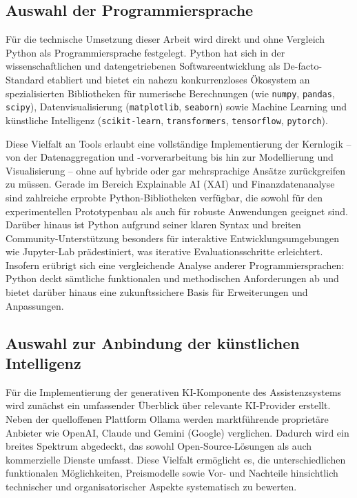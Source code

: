   \subsection{Auswahl der Programmiersprache}

    Für die technische Umsetzung dieser Arbeit wird direkt und ohne Vergleich Python als Programmiersprache festgelegt.
    Python hat sich in der wissenschaftlichen und datengetriebenen Softwareentwicklung als De-facto-Standard etabliert und bietet ein nahezu konkurrenzloses Ökosystem an spezialisierten Bibliotheken für numerische Berechnungen (wie \texttt{numpy}, \texttt{pandas}, \texttt{scipy}), Datenvisualisierung (\texttt{matplotlib}, \texttt{seaborn}) sowie Machine Learning und künstliche Intelligenz (\texttt{scikit-learn}, \texttt{transformers}, \texttt{tensorflow}, \texttt{pytorch}).

    Diese Vielfalt an Tools erlaubt eine vollständige Implementierung der Kernlogik -- von der Datenaggregation und -vorverarbeitung bis hin zur Modellierung und Visualisierung -- ohne auf hybride oder gar mehrsprachige Ansätze zurückgreifen zu müssen.
    Gerade im Bereich Explainable AI (\acs{XAI}) und Finanzdatenanalyse sind zahlreiche erprobte Python-Bibliotheken verfügbar, die sowohl für den experimentellen Prototypenbau als auch für robuste Anwendungen geeignet sind.
    Darüber hinaus ist Python aufgrund seiner klaren Syntax und breiten Community-Unterstützung besonders für interaktive Entwicklungsumgebungen wie Jupyter-Lab prädestiniert, was iterative Evaluationsschritte erleichtert.
    Insofern erübrigt sich eine vergleichende Analyse anderer Programmiersprachen: Python deckt sämtliche funktionalen und methodischen Anforderungen ab und bietet darüber hinaus eine zukunftssichere Basis für Erweiterungen und Anpassungen.

  \subsection{Auswahl zur Anbindung der künstlichen Intelligenz}

    Für die Implementierung der generativen \acs{KI}-Komponente des Assistenzsystems wird zunächst ein umfassender Überblick über relevante \acs{KI}-Provider erstellt.
    Neben der quelloffenen Plattform Ollama werden marktführende proprietäre Anbieter wie OpenAI, Claude und Gemini (Google) verglichen.
    Dadurch wird ein breites Spektrum abgedeckt, das sowohl Open-Source-Lösungen als auch kommerzielle Dienste umfasst.
    Diese Vielfalt ermöglicht es, die unterschiedlichen funktionalen Möglichkeiten, Preismodelle sowie Vor- und Nachteile hinsichtlich technischer und organisatorischer Aspekte systematisch zu bewerten.

